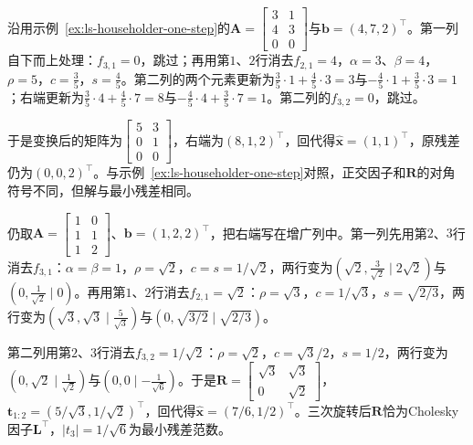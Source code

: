 \begin{example}[一次旋转完成的三角化]
\label{ex:ls-givens-one-step}
沿用示例~\ref{ex:ls-householder-one-step}的$\bm A=\left[\begin{smallmatrix}3&1\\4&3\\0&0\end{smallmatrix}\right]$与$\bm b=(4,7,2)^\top$。第一列自下而上处理：$f_{3,1}=0$，跳过；再用第$1$、$2$行消去$f_{2,1}=4$，$\alpha=3$、$\beta=4$，$\rho=5$，$c=\tfrac35$，$s=\tfrac45$。第二列的两个元素更新为$\tfrac35\cdot1+\tfrac45\cdot3=3$与$-\tfrac45\cdot1+\tfrac35\cdot3=1$；右端更新为$\tfrac35\cdot4+\tfrac45\cdot7=8$与$-\tfrac45\cdot4+\tfrac35\cdot7=1$。第二列的$f_{3,2}=0$，跳过。

于是变换后的矩阵为$\left[\begin{smallmatrix}5&3\\0&1\\0&0\end{smallmatrix}\right]$，右端为$(8,1,2)^\top$，回代得$\hat{\bm x}=(1,1)^\top$，原残差仍为$(0,0,2)^\top$。与示例~\ref{ex:ls-householder-one-step}对照，正交因子和$\bm R$的对角符号不同，但解与最小残差相同。
\end{example}

\begin{example}[直线拟合的Givens三角化]
\label{ex:ls-givens-line-fit}
仍取$\bm A=\left[\begin{smallmatrix}1&0\\1&1\\1&2\end{smallmatrix}\right]$、$\bm b=(1,2,2)^\top$，把右端写在增广列中。第一列先用第$2$、$3$行消去$f_{3,1}$：$\alpha=\beta=1$，$\rho=\sqrt2$，$c=s=1/\sqrt2$，两行变为$(\sqrt2,\tfrac3{\sqrt2}\mid2\sqrt2)$与$(0,\tfrac1{\sqrt2}\mid0)$。再用第$1$、$2$行消去$f_{2,1}=\sqrt2$：$\rho=\sqrt3$，$c=1/\sqrt3$，$s=\sqrt{2/3}$，两行变为$(\sqrt3,\sqrt3\mid\tfrac5{\sqrt3})$与$(0,\sqrt{3/2}\mid\sqrt{2/3})$。

第二列用第$2$、$3$行消去$f_{3,2}=1/\sqrt2$：$\rho=\sqrt2$，$c=\sqrt3/2$，$s=1/2$，两行变为$(0,\sqrt2\mid\tfrac1{\sqrt2})$与$(0,0\mid-\tfrac1{\sqrt6})$。于是$\bm R=\left[\begin{smallmatrix}\sqrt3&\sqrt3\\0&\sqrt2\end{smallmatrix}\right]$，$\bm t_{1:2}=(5/\sqrt3,1/\sqrt2)^\top$，回代得$\hat{\bm x}=(7/6,1/2)^\top$。三次旋转后$\bm R$恰为Cholesky因子$\bm L^\top$，$\lvert t_3\rvert=1/\sqrt6$为最小残差范数。
\end{example}

